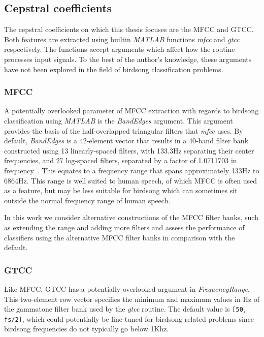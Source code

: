 \subsection{Cepstral coefficients}

The cepstral coefficients on which this thesis focuses are the MFCC and GTCC\@.
Both features are extracted using builtin \textit{MATLAB} functions
\textit{mfcc} and \textit{gtcc} respectively. The functions accept arguments
which affect how the routine processes input signals. To the best of the
author's knowledge, these arguments have not been explored in the field of
birdsong classification problems.

\subsubsection{MFCC}

A potentially overlooked parameter of MFCC extraction with regards to birdsong
classification using \textit{MATLAB} is the \textit{BandEdges} argument. This
argument provides the basis of the half-overlapped triangular filters that
\textit{mfcc} uses. By default, \textit{BandEdges} is a 42-element vector that
results in a 40-band filter bank constructed using 13 linearly-spaced filters,
with 133.3Hz separating their center frequencies, and 27 log-spaced filters,
separated by a factor of 1.0711703 in frequency~\cite{slaney1998auditory}. This
equates to a frequency range that spans approximately 133Hz to 6864Hz. This
range is well suited to human speech, of which MFCC is often used as a feature,
but may be less suitable for birdsong which can sometimes sit outside the normal
frequency range of human speech.

In this work we consider alternative constructions of the MFCC filter banks,
such as extending the range and adding more filters and assess the performance
of classifiers using the alternative MFCC filter banks in comparison with the
default.

\subsubsection{GTCC}

Like MFCC, GTCC has a potentially overlooked argument in
\textit{FrequencyRange}. This two-element row vector specifies the minimum and
maximum values in Hz of the gammatone filter bank used by the \textit{gtcc}
routine. The default value is \texttt{[50, fs/2]}, which could potentially be
fine-tuned for birdsong related problems since birdsong frequencies do not
typically go below 1Khz.

